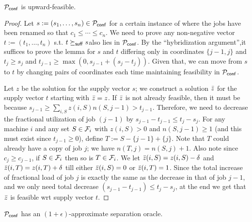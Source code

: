 \begin{lemma}\label{lem:conf-is-uf}
${\cal P}_\mathsf{conf}$ is upward-feasible.
\end{lemma}
\begin{proof}
Let $s := (s_1,\ldots,s_n)\in {\cal P}_\mathsf{conf}$ for a certain instance of \cckp where the jobs have been renamed so that $c_1\leq \cdots \leq c_n$. We need to prove any non-negative vector $t := (t_1,\ldots,t_n)$ s.t. $t\succeq_{\mathsf{suff}} s$also lies in ${\cal P}_\mathsf{conf}$. 
By the ``hybridization argument'',it suffices to prove the lemma for  $s$ and $t$ differing only in coordinates $\{j-1,j\}$ and $ t_j\ge s_j$ and $t_{j-1} \geq \max(0,s_{j-1} + (s_j - t_j))$.
Given that, we can move from $s$ to $t$ by changing pairs of coordinates each time maintaining feasibility in ${\cal P}_\mathsf{conf}$.

Let $z$ be the solution for the supply vector $s$; we construct a solution $\bar z$  for the supply vector $t$ starting with $\bar z = z$.
If $\bar z$ is not already feasible, then it must be because $s_{j-1} \ge \sum_{i,S} z(i,S)n(S,j-1) > t_{j-1}$.
Therefore, we need to decrease the fractional utilization of job $(j-1)$ by $s_{j-1} - t_{j-1} \leq t_j - s_j$.
For any machine $i$ and any set $S\in {\cal F}_i$ with $z(i,S) > 0$ and $n(S,j-1) \geq 1$ (and this must exist since $t_{j-1}\geq 0$), 
define $T := S - \{j-1\} + \{j\}$. Note that $T$ could already have a copy of job $j$; we have $n(T,j) = n(S,j) + 1$. Also note since $c_j \geq c_{j-1}$, if $S\in {\cal F}_i$ then so is $T\in {\cal F}_i$.
We let $\bar z(i,S) = z(i,S) - \delta$ and $\bar z(i,T) = z(i,T) + \delta$ till
either $\bar z(i,S) = 0$ or $\bar z(i,T) = 1$. Since the total increase of fractional load of job $j$ is exactly the same as the decrease in that of job $j-1$, and we only need total  decrease $(s_{j-1} -t_{j-1}) \leq t_j - s_j$, at the end we get that $\bar z$ is feasible wrt supply vector $t$.
\end{proof}
\begin{lemma}\label{lem:conf-so}
	${\cal P}_\mathsf{conf}$ has an $(1+\epsilon)$-approximate separation oracle.
\end{lemma}

